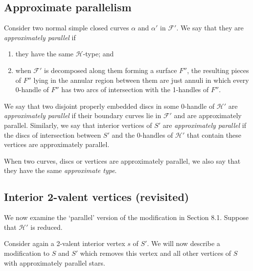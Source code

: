\documentclass[oneside]{amsart}
\numberwithin{equation}{section}
\theoremstyle{plain}
\theoremstyle{definition}
\begin{document}
\subsection{Approximate parallelism}

Consider two normal simple closed curves $\alpha$ and $\alpha'$ in $\mathcal{F}'$.
We say that they are \emph{approximately parallel} if
\begin{enumerate}
\item they have the same $\mathcal{H}$-type; and
\item when $\mathcal{F}'$ is decomposed along them forming a surface $F''$, the resulting pieces
of $F''$ lying in the annular region between them are just annuli in which every 0-handle of $F''$
has two arcs of intersection with the 1-handles of $F''$.
\end{enumerate}

We say that two disjoint properly embedded discs in some 0-handle
of $\mathcal{H}'$ are \emph{approximately parallel} if their boundary curves lie in $\mathcal{F}'$
and are approximately parallel. Similarly, we say that 
interior vertices of $S'$ are \emph{approximately parallel} if the discs of intersection
between $S'$ and the 0-handles of $\mathcal{H}'$ that contain these vertices
are approximately parallel.

When two curves, discs or vertices are approximately parallel, we also say that they
have the same \emph{approximate type}.

\subsection{Interior 2-valent vertices (revisited)}
\label{Subsec:InteriorTwoValRevisited}

We now examine the `parallel' version of the modification in Section 8.1. 
Suppose that $\mathcal{H}'$ is reduced.

Consider again a 2-valent interior vertex $s$ of $S'$. We will now describe a modification to
$S$ and $S'$ which removes this vertex and all other vertices of $S$ with approximately parallel stars.
\end{document}
